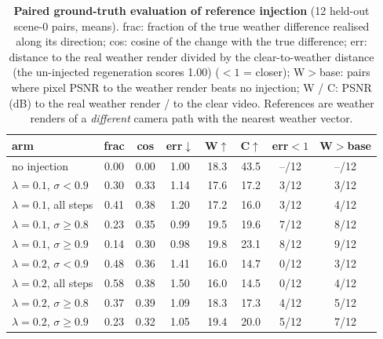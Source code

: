 \begin{table}[!htb]
\centering\small
\begin{tabular}{lccccccc}
\toprule
arm & frac & cos & err$\downarrow$ & W$\uparrow$ & C$\uparrow$ & err$<1$ & W$>$base \\
\midrule
no injection & 0.00 & 0.00 & 1.00 & 18.3 & 43.5 & --/12 & --/12 \\
$\lambda{=}0.1$, $\sigma<0.9$ & 0.30 & 0.33 & 1.14 & 17.6 & 17.2 & 3/12 & 3/12 \\
$\lambda{=}0.1$, all steps & 0.41 & 0.38 & 1.20 & 17.2 & 16.0 & 3/12 & 4/12 \\
$\lambda{=}0.1$, $\sigma\ge0.8$ & 0.23 & 0.35 & 0.99 & 19.5 & 19.6 & 7/12 & 8/12 \\
$\lambda{=}0.1$, $\sigma\ge0.9$ & 0.14 & 0.30 & 0.98 & 19.8 & 23.1 & 8/12 & 9/12 \\
$\lambda{=}0.2$, $\sigma<0.9$ & 0.48 & 0.36 & 1.41 & 16.0 & 14.7 & 0/12 & 3/12 \\
$\lambda{=}0.2$, all steps & 0.58 & 0.38 & 1.50 & 16.0 & 14.5 & 0/12 & 4/12 \\
$\lambda{=}0.2$, $\sigma\ge0.8$ & 0.37 & 0.39 & 1.09 & 18.3 & 17.3 & 4/12 & 5/12 \\
$\lambda{=}0.2$, $\sigma\ge0.9$ & 0.23 & 0.32 & 1.05 & 19.4 & 20.0 & 5/12 & 7/12 \\
\bottomrule
\end{tabular}
\caption{\textbf{Paired ground-truth evaluation of reference injection} (12 held-out scene-0 pairs, means). frac: fraction of the true weather difference realised along its direction; cos: cosine of the change with the true difference; err: distance to the real weather render divided by the clear-to-weather distance (the un-injected regeneration scores 1.00) (${<}1$ = closer); W$>$base: pairs where pixel PSNR to the weather render beats no injection; W / C: PSNR (dB) to the real weather render / to the clear video. References are weather renders of a \emph{different} camera path with the nearest weather vector.}
\label{tab:kv}
\end{table}
